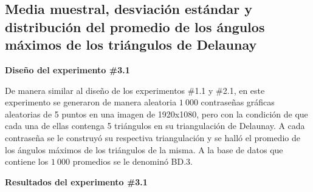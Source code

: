 \documentclass[12pt]{report}
\begin{document}
\subsection{Media muestral, desviación estándar y distribución del promedio de los ángulos máximos de los triángulos de Delaunay}
\label{sec:3.1}

\textbf{ Diseño del experimento \#3.1}

De manera similar al diseño de los experimentos \#1.1 y \#2.1, en este experimento se generaron de manera aleatoria $1\ 000$ contraseñas gráficas aleatorias de 5 puntos en una imagen de 1920x1080, pero con la condición de que cada una de ellas contenga 5 triángulos en su triangulación de Delaunay. A cada contraseña se le construyó su respectiva triangulación y se halló el promedio de los ángulos máximos de los triángulos de la misma. A la base de datos que contiene los $1\ 000$ promedios se le denominó BD.3.



\textbf{Resultados del experimento \#3.1}
\end{document}

